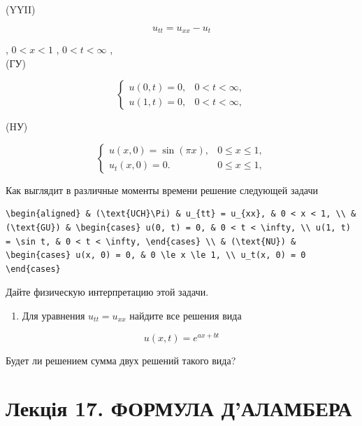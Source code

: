 \documentclass[
  ukrainian,
]{article}
\providecommand{\tightlist}{%
  \setlength{\itemsep}{0pt}\setlength{\parskip}{0pt}}
\begin{document}
(YYII)

\[
u_{tt} = u_{xx} - u_t
\]

, \(0 < x < 1\) , \(0 < t < \infty\) ,\\
(ГУ)

\[
\begin{cases} u(0, t) = 0, & 0 < t < \infty, \\ u(1, t) = 0, & 0 < t < \infty, \end{cases}
\]

(HУ)

\[
\begin{cases} u(x, 0) = \sin(\pi x), & 0 \le x \le 1, \\ u_t(x, 0) = 0. & 0 \le x \le 1, \end{cases}
\]

Как выглядит в различные моменты времени решение следующей задачи

\begin{verbatim}
\begin{aligned} & (\text{UCH}\Pi) & u_{tt} = u_{xx}, & 0 < x < 1, \\ & (\text{GU}) & \begin{cases} u(0, t) = 0, & 0 < t < \infty, \\ u(1, t) = \sin t, & 0 < t < \infty, \end{cases} \\ & (\text{NU}) & \begin{cases} u(x, 0) = 0, & 0 \le x \le 1, \\ u_t(x, 0) = 0 \end{cases}
\end{verbatim}

Дайте физическую интерпретацию этой задачи.

\begin{enumerate}
\def\labelenumi{\arabic{enumi}.}
\setcounter{enumi}{3}
\tightlist
\item
  Для уравнения \(u_{tt} = u_{xx}\) найдите все решения вида
\end{enumerate}

\[
u(x, t) = e^{ax+bt}
\]

Будет ли решением сумма двух решений такого вида?

\section{Лекція 17. ФОРМУЛА
Д'АЛАМБЕРА}\label{ux43bux435ux43aux446ux456ux44f-17.-ux444ux43eux440ux43cux443ux43bux430-ux434ux430ux43bux430ux43cux431ux435ux440ux430}
\end{document}
